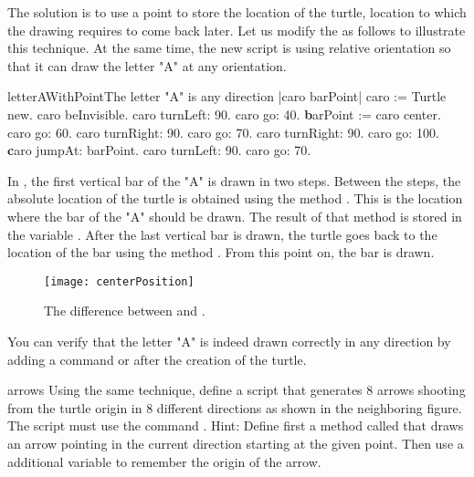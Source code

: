 The solution is to use a point to store the location of the
turtle, location to which the drawing requires to come back later.
Let us modify the  as follows to illustrate
this technique. At the same time, the new script is using relative
orientation so that it can draw the letter "A" at any orientation.

\begin{scriptfig}{letterAWithPoint}{The letter "A" is any direction}\label{scr:absoluteA}
|caro barPoint|
caro := Turtle new.
caro beInvisible.
caro turnLeft: 90.
caro go: 40.
{\textbf barPoint := caro center}.
caro go: 60.
caro turnRight: 90.
caro go: 70.
caro turnRight: 90.
caro go: 100.
{\textbf caro jumpAt: barPoint.}
caro turnLeft: 90.
caro go: 70.\end{scriptfig}

In , the first vertical bar of the "A"
is drawn in two steps. Between the steps, the absolute location of
the turtle is obtained using the method .
This is the location where the bar of the "A" should be drawn. The
result of that method is stored in the variable
. After the last vertical bar is drawn, the turtle goes back to the
location of the bar using the method . From this point on, the bar is drawn.

\begin{figure}
\begin{center}
\texttt{[image: centerPosition]}
\caption{The difference between  and . \label{fig:centerPosition}}
\end{center}
\end{figure}

You can verify that the letter "A" is indeed drawn correctly in
any direction by adding a command  or
 after the creation of the turtle. 



\begin{exofig}{arrows} \label{exo:arrows}
Using the same technique, define a script that generates 8 arrows shooting from the turtle
origin in 8 different directions as shown in the neighboring
figure. The script must use the command .
Hint: Define first a method called  that draws an arrow pointing in the current 
direction starting at the given point. Then use a additional variable to remember the origin of the arrow.
\end{exofig}

